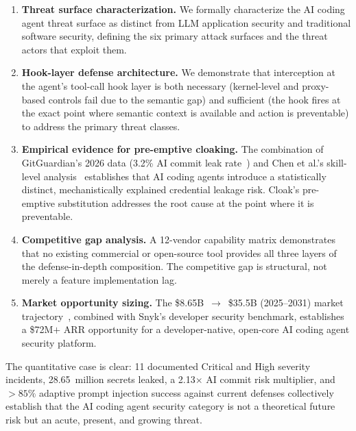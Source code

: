\documentclass[11pt,letterpaper]{article}
\begin{document}
\begin{enumerate}[noitemsep,topsep=2pt]
  \item \textbf{Threat surface characterization.} We formally characterize the AI
        coding agent threat surface as distinct from LLM application security and
        traditional software security, defining the six primary attack surfaces and
        the threat actors that exploit them.

  \item \textbf{Hook-layer defense architecture.} We demonstrate that interception at
        the agent's tool-call hook layer is both necessary (kernel-level and proxy-based
        controls fail due to the semantic gap) and sufficient (the hook fires at the
        exact point where semantic context is available and action is preventable) to
        address the primary threat classes.

  \item \textbf{Empirical evidence for pre-emptive cloaking.} The combination of
        GitGuardian's 2026 data (3.2\% AI commit leak rate~\citep{gitguardian2026state})
        and Chen et al.'s skill-level analysis~\citep{chen2026credential} establishes
        that AI coding agents introduce a statistically distinct, mechanistically
        explained credential leakage risk. Cloak's pre-emptive substitution addresses
        the root cause at the point where it is preventable.

  \item \textbf{Competitive gap analysis.} A 12-vendor capability matrix demonstrates
        that no existing commercial or open-source tool provides all three layers of
        the defense-in-depth composition. The competitive gap is structural, not merely
        a feature implementation lag.

  \item \textbf{Market opportunity sizing.} The \$8.65B~$\to$~\$35.5B (2025--2031)
        market trajectory~\citep{marketsandmarkets2026generative}, combined with
        Snyk's developer security benchmark, establishes a \$72M$+$ ARR opportunity
        for a developer-native, open-core AI coding agent security platform.
\end{enumerate}

The quantitative case is clear: 11 documented Critical and High severity incidents,
28.65~million secrets leaked, a 2.13$\times$ AI commit risk multiplier, and ${>}85\%$
adaptive prompt injection success against current defenses collectively establish that
the AI coding agent security category is not a theoretical future risk but an acute,
present, and growing threat.
\end{document}

